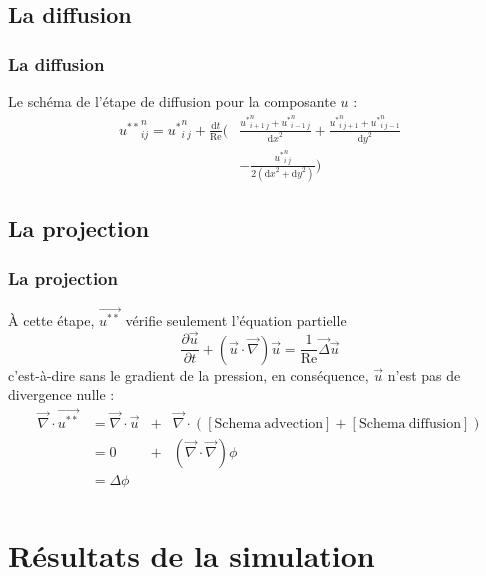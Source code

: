 \documentclass{beamer}
\renewcommand{\d}{\textrm{d}}
\newcommand{\nablaf}{\overrightarrow\nabla}
\begin{document}
  \subsection{La diffusion} 
  \begin{frame}
    \frametitle{La diffusion}
    Le schéma de l'étape de diffusion pour la composante $u$ : 
    \begin{align*}
    {u^{**}}_{i j}^n = {u^*}_{i \ j}^{n} + \frac{\d t}{\mathrm{Re}}
    \Bigg( & \frac{{u^*}_{i+1 \ j}^n + {u^*}_{i-1 \ j}^n}{{\d x}^2}
    + \frac{{u^*}_{i \ j+1}^n + {u^*}_{i \ j-1}^n}{{\d y}^2}\\
    &  -\frac{{u^*}_{i \ j}^{n}}{2({\d x}^2 + {\d y}^2)} \Bigg)
    \end{align*}
  \end{frame}	
  
  \subsection{La projection}
  \begin{frame}
    \frametitle{La projection}
    À cette étape, $\overrightarrow{u^{**}}$ vérifie seulement l'équation partielle
    \[ \frac{\partial\overrightarrow{u}}{\partial t} +
    (\overrightarrow{u} \cdot  \nablaf) \overrightarrow{u} =
    \frac{1}{\mathrm{Re}} \overrightarrow{\Delta} \overrightarrow{u} \]
    c'est-à-dire sans le gradient de la pression, en conséquence,
    $\overrightarrow{u}$ n'est pas de divergence nulle :
    \begin{align*}
      \nablaf \cdot \overrightarrow{u^{**}} & = \nablaf \cdot
      \overrightarrow{u}	& + &\nablaf \cdot ( [\mathrm{Schema 
        \ advection}] + [\mathrm{Schema \ diffusion}])\\ 
      & = 0  &+ & (\nablaf \cdot \nablaf) \phi \\ 
      & = \Delta \phi & & \\
    \end{align*}
  \end{frame}	 
  
\section{Résultats de la simulation}
\end{document}
